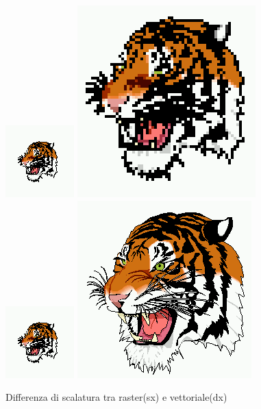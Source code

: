 \documentclass[a4paper, 10pt]{article}
\begin{document}
		\begin{figure}[h!]
			\includegraphics[scale=0.4]{tiger1.png}
			\hspace*{0.4cm}
			\includegraphics[scale=0.4]{tiger.png}
			\hspace*{0.4cm}
			\includegraphics[scale=0.4]{tiger1.png}
			\hspace*{0.4cm}
			\includegraphics[scale=0.4]{tiger2.png}
			\caption{Differenza di scalatura tra raster(sx) e vettoriale(dx) }
		\end{figure}
		
		
		\newpage
		
\end{document}
